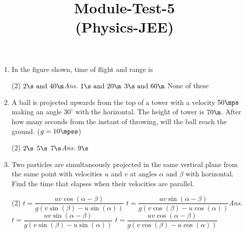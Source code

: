 \documentclass{article}
\title{Module-Test-5\\(Physics-JEE)}
\newcommand{\ans}{\textcolor{red!95}{\textit{\quad Ans.}}}
\begin{document}
\maketitle

\begin{enumerate}
	\item In the figure shown, time of flight and range is
	\begin{center}
	\end{center}
	\begin{tasks}(2)
		\task $2\s \text{ and } 40\m$\ans
		\task $1\s \text{ and } 20\m$
		\task $3\s \text{ and } 60\m$
		\task None of these
	\end{tasks}
	
	\item A ball is projected upwards from the top of a tower with a velocity $50\mps$ making an angle $30^\circ$ with the horizontal. The height of tower is $70 \m$. After how many seconds from the instant of throwing, will the ball reach the ground. ($g = 10 \mpss$)	
	\begin{tasks}(2)
		\task $2\s$
		\task $5\s$
		\task $7\s$\ans
		\task $9\s$
	\end{tasks}
	
	\item Two particles are simultaneously projected in the same vertical plane from the same point with velocities $u$ and $v$ at angles $\alpha$ and $\beta$ with horizontal. Find the time that elapses when their velocities are parallel.	
	\begin{center}
	\end{center}
	\begin{tasks}(2)
		\task $t=\dfrac{uv\cos(\alpha-\beta)}{g(v\sin(\beta)-u\sin(\alpha))}$
		\task $t=\dfrac{uv\sin(\alpha-\beta)}{g(v\cos(\beta)-u\cos(\alpha))}$\ans
		\task $t=\dfrac{uv\sin(\alpha-\beta)}{g(v\sin(\beta)-u\sin(\alpha))}$
		\task $t=\dfrac{uv\cos(\alpha-\beta)}{g(v\cos(\beta)-u\cos(\alpha))}$
	\end{tasks}
	

\end{enumerate}
\end{document}
